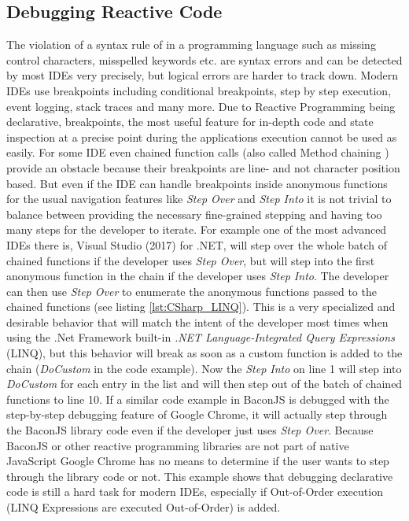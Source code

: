 \subsection{Debugging Reactive Code}
The violation of a syntax rule of in a programming language such as missing control characters, misspelled keywords etc. are syntax errors and can be detected by most IDEs very precisely, but logical errors are harder to track down. Modern IDEs use breakpoints including conditional breakpoints, step by step execution, event logging, stack traces and many more. Due to Reactive Programming being declarative, breakpoints, the most useful feature for in-depth code and state inspection at a precise point during the applications execution cannot be used as easily. For some IDE even chained function calls (also called Method chaining \cite{MethodChaining}) provide an obstacle because their breakpoints are line- and not character position based. But even if the IDE can handle breakpoints inside anonymous functions for the usual navigation features like \emph{Step Over} and \emph{Step Into} it is not trivial to balance between providing the necessary fine-grained stepping and having too many steps for the developer to iterate. For example one of the most advanced IDEs there is, Visual Studio (2017) for .NET, will step over the whole batch of chained functions if the developer uses \emph{Step Over}, but will step into the first anonymous function in the chain if the developer uses \emph{Step Into}. The developer can then use \emph{Step Over} to enumerate the anonymous functions passed to the chained functions (see listing \ref{lst:CSharp_LINQ}). This is a very specialized and desirable behavior that will match the intent of the developer most times when using the .Net Framework built-in \emph{.NET Language-Integrated Query Expressions} (LINQ), but this behavior will break as soon as a custom function is added to the chain (\emph{DoCustom} in the code example). Now the \emph{Step Into} on line 1 will step into \emph{DoCustom} for each entry in the list and will then step out of the batch of chained functions to line 10. If a similar code example in BaconJS is debugged with the step-by-step debugging feature of Google Chrome, it will actually step through the BaconJS library code even if the developer just uses \emph{Step Over}. Because BaconJS or other reactive programming libraries are not part of native JavaScript Google Chrome has no means to determine if the user wants to step through the library code or not.
This example shows that debugging declarative code is still a hard task for modern IDEs, especially if Out-of-Order execution (LINQ Expressions are executed Out-of-Order) is added.
